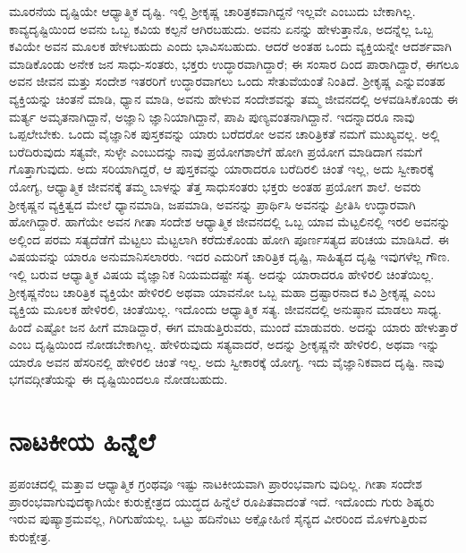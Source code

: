 ಮೂರನೆಯ ದೃಷ್ಟಿಯೇ ಆಧ್ಯಾತ್ಮಿಕ ದೃಷ್ಟಿ. ಇಲ್ಲಿ ಶ್ರೀಕೃಷ್ಣ ಚಾರಿತ್ರಕವಾಗಿದ್ದನೆ ಇಲ್ಲವೇ ಎಂಬುದು ಬೇಕಾಗಿಲ್ಲ. ಕಾವ್ಯದೃಷ್ಟಿಯಿಂದ ಅವನು ಒಬ್ಬ ಕವಿಯ ಕಲ್ಪನೆ ಆಗಿರಬಹುದು. ಅವನು ಏನನ್ನು ಹೇಳುತ್ತಾನೊ, ಅದನ್ನೆಲ್ಲ ಒಬ್ಬ ಕವಿಯೇ ಅವನ ಮೂಲಕ ಹೇಳಬಹುದು ಎಂದು ಭಾವಿಸಬಹುದು. ಆದರೆ ಅಂತಹ ಒಂದು ವ್ಯಕ್ತಿಯನ್ನೇ ಆದರ್ಶವಾಗಿ ಮಾಡಿಕೊಂಡು ಅನೇಕ ಜನ ಸಾಧು-ಸಂತರು, ಭಕ್ತರು ಉದ್ಧಾರವಾಗಿದ್ದಾರೆ; ಈ ಸಂಸಾರ ದಿಂದ ಪಾರಾಗಿದ್ದಾರೆ, ಈಗಲೂ ಅವನ ಜೀವನ ಮತ್ತು ಸಂದೇಶ ಇತರರಿಗೆ ಉದ್ಧಾರವಾಗಲು ಒಂದು ಸೇತುವೆಯಂತೆ ನಿಂತಿದೆ. ಶ್ರೀಕೃಷ್ಣ ಎನ್ನುವಂತಹ ವ್ಯಕ್ತಿಯನ್ನು ಚಿಂತನೆ ಮಾಡಿ, ಧ್ಯಾನ ಮಾಡಿ, ಅವನು ಹೇಳುವ ಸಂದೇಶವನ್ನು ತಮ್ಮ ಜೀವನದಲ್ಲಿ ಅಳವಡಿಸಿಕೊಂಡು ಈ ಮರ್ತ್ಯ ಅಮೃತನಾಗಿದ್ದಾನೆ, ಅಜ್ಞಾನಿ ಜ್ಞಾನಿಯಾಗಿದ್ದಾನೆ, ಪಾಪಿ ಪುಣ್ಯವಂತನಾಗಿದ್ದಾನೆ. ಇದನ್ನಾದರೂ ನಾವು ಒಪ್ಪಲೇಬೇಕು. ಒಂದು ವೈಜ್ಞಾನಿಕ ಪುಸ್ತಕವನ್ನು ಯಾರು ಬರೆದರೋ ಅವನ ಚಾರಿತ್ರಿಕತೆ ನಮಗೆ ಮುಖ್ಯವಲ್ಲ. ಅಲ್ಲಿ ಬರೆದಿರುವುದು ಸತ್ಯವೇ, ಸುಳ್ಳೇ ಎಂಬುದನ್ನು ನಾವು ಪ್ರಯೋಗಶಾಲೆಗೆ ಹೋಗಿ ಪ್ರಯೋಗ ಮಾಡಿದಾಗ ನಮಗೆ ಗೊತ್ತಾಗುವುದು. ಅದು ಸರಿಯಾಗಿದ್ದರೆ, ಆ ಪುಸ್ತಕವನ್ನು ಯಾರಾದರೂ ಬರೆದಿರಲಿ ಚಿಂತೆ ಇಲ್ಲ, ಅದು ಸ್ವೀಕಾರಕ್ಕೆ ಯೋಗ್ಯ, ಆಧ್ಯಾತ್ಮಿಕ ಜೀವನಕ್ಕೆ ತಮ್ಮ ಬಾಳನ್ನು ತೆತ್ತ ಸಾಧುಸಂತರು ಭಕ್ತರು ಅಂತಹ ಪ್ರಯೋಗ ಶಾಲೆ. ಅವರು ಶ್ರೀಕೃಷ್ಣನ ವ್ಯಕ್ತಿತ್ವದ ಮೇಲೆ ಧ್ಯಾನಮಾಡಿ, ಜಪಮಾಡಿ, ಅವನನ್ನು ಪ್ರಾರ್ಥಿಸಿ ಅವನನ್ನು ಪ್ರೀತಿಸಿ ಉದ್ಧಾರವಾಗಿ ಹೋಗಿದ್ದಾರೆ. ಹಾಗೆಯೇ ಅವನ ಗೀತಾ ಸಂದೇಶ ಆಧ್ಯಾತ್ಮಿಕ ಜೀವನದಲ್ಲಿ ಒಬ್ಬ ಯಾವ ಮೆಟ್ಟಲಿನಲ್ಲಿ ಇರಲಿ ಅವನನ್ನು ಅಲ್ಲಿಂದ ಪರಮ ಸತ್ಯದೆಡೆಗೆ ಮೆಟ್ಟಲು ಮೆಟ್ಟಲಾಗಿ ಕರೆದುಕೊಂಡು ಹೋಗಿ ಪೂರ್ಣಸತ್ಯದ ಪರಿಚಯ ಮಾಡಿಸಿದೆ. ಈ ವಿಷಯವನ್ನು ಯಾರೂ ಅನುಮಾನಿಸಲಾರರು. ಇದರ ಎದುರಿಗೆ ಚಾರಿತ್ರಿಕ ದೃಷ್ಟಿ, ಸಾಹಿತ್ಯದ ದೃಷ್ಟಿ ಇವುಗಳೆಲ್ಲ ಗೌಣ. ಇಲ್ಲಿ ಬರುವ ಆಧ್ಯಾತ್ಮಿಕ ವಿಷಯ ವೈಜ್ಞಾನಿಕ ನಿಯಮದಷ್ಟೇ ಸತ್ಯ. ಅದನ್ನು ಯಾರಾದರೂ ಹೇಳಿರಲಿ ಚಿಂತೆಯಿಲ್ಲ. ಶ್ರೀಕೃಷ್ಣನೆಂಬ ಚಾರಿತ್ರಿಕ ವ್ಯಕ್ತಿಯೇ ಹೇಳಿರಲಿ ಅಥವಾ ಯಾವನೋ ಒಬ್ಬ ಮಹಾ ದ್ರಷ್ಟಾರನಾದ ಕವಿ ಶ್ರೀಕೃಷ್ಣ ಎಂಬ ವ್ಯಕ್ತಿಯ ಮೂಲಕ ಹೇಳಿರಲಿ, ಚಿಂತೆಯಿಲ್ಲ. ಇದೊಂದು ಆಧ್ಯಾತ್ಮಿಕ ಸತ್ಯ. ಜೀವನದಲ್ಲಿ ಅನುಷ್ಠಾನ ಮಾಡಲು ಸಾಧ್ಯ. ಹಿಂದೆ ಎಷ್ಟೋ ಜನ ಹೀಗೆ ಮಾಡಿದ್ದಾರೆ, ಈಗ ಮಾಡುತ್ತಿರುವರು, ಮುಂದೆ ಮಾಡುವರು. ಅದನ್ನು ಯಾರು ಹೇಳುತ್ತಾರೆ ಎಂಬ ದೃಷ್ಟಿಯಿಂದ ನೋಡಬೇಕಾಗಿಲ್ಲ. ಹೇಳಿರುವುದು ಸತ್ಯವಾದರೆ, ಅದನ್ನು ಶ್ರೀಕೃಷ್ಣನೇ ಹೇಳಿರಲಿ, ಅಥವಾ ಇನ್ನು ಯಾರೊ ಅವನ ಹೆಸರಿನಲ್ಲಿ ಹೇಳಿರಲಿ ಚಿಂತೆ ಇಲ್ಲ. ಅದು ಸ್ವೀಕಾರಕ್ಕೆ ಯೋಗ್ಯ. ಇದು ವೈಜ್ಞಾನಿಕವಾದ ದೃಷ್ಟಿ. ನಾವು ಭಗವದ್ಗೀತೆಯನ್ನು ಈ ದೃಷ್ಟಿಯಿಂದಲೂ ನೋಡಬಹುದು.


\section*{ನಾಟಕೀಯ ಹಿನ್ನೆಲೆ}

ಪ್ರಪಂಚದಲ್ಲಿ ಮತ್ತಾವ ಆಧ್ಯಾತ್ಮಿಕ ಗ್ರಂಥವೂ ಇಷ್ಟು ನಾಟಕೀಯವಾಗಿ ಪ್ರಾರಂಭವಾಗು ವುದಿಲ್ಲ. ಗೀತಾ ಸಂದೇಶ ಪ್ರಾರಂಭವಾಗುವುದಕ್ಕಾಗಿಯೇ ಕುರುಕ್ಷೇತ್ರದ ಯುದ್ಧದ ಹಿನ್ನೆಲೆ ರೂಪಿತವಾದಂತೆ ಇದೆ. ಇದೊಂದು ಗುರು ಶಿಷ್ಯರು ಇರುವ ಪುಷ್ಯಾಶ್ರಮವಲ್ಲ, ಗಿರಿಗುಹೆಯಲ್ಲ. ಒಟ್ಟು ಹದಿನೆಂಟು ಅಕ್ಷೋಹಿಣಿ ಸೈನ್ಯದ ವೀರರಿಂದ ಮೊಳಗುತ್ತಿರುವ ಕುರುಕ್ಷೇತ್ರ.

